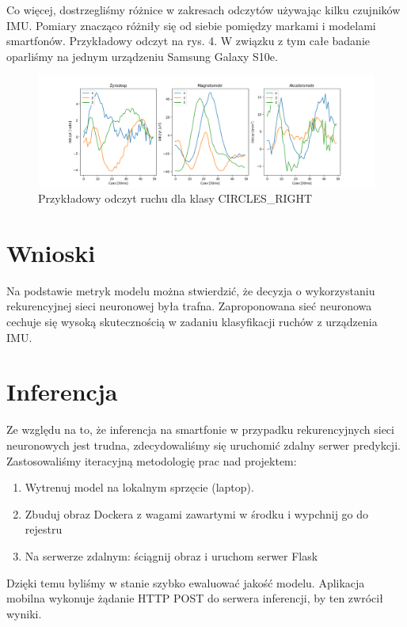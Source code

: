 \documentclass[10pt]{article}
\begin{document}
Co więcej, dostrzegliśmy różnice w zakresach odczytów używając kilku czujników IMU. Pomiary znacząco różniły się od siebie pomiędzy markami i modelami smartfonów. Przykładowy odczyt na rys. 4. W związku z tym całe badanie oparliśmy na jednym urządzeniu Samsung Galaxy S10e.


\begin{figure}[H]
  \includegraphics[width=16cm]{sample.png}
  \centering
  \caption{Przykładowy odczyt ruchu dla klasy CIRCLES\_RIGHT}
\end{figure}

\section{Wnioski}

Na podstawie metryk modelu można stwierdzić, że decyzja o wykorzystaniu rekurencyjnej sieci neuronowej była trafna. Zaproponowana sieć neuronowa cechuje się wysoką skutecznością w zadaniu klasyfikacji ruchów z urządzenia IMU.

\section{Inferencja}

Ze względu na to, że inferencja na smartfonie w przypadku rekurencyjnych sieci neuronowych jest trudna, zdecydowaliśmy się uruchomić zdalny serwer predykcji. Zastosowaliśmy iteracyjną metodologię prac nad projektem: 

\begin{enumerate}
  \item Wytrenuj model na lokalnym sprzęcie (laptop).
  \item Zbuduj obraz Dockera z wagami zawartymi w środku i wypchnij go do rejestru
  \item Na serwerze zdalnym: ściągnij obraz i uruchom serwer Flask
\end{enumerate}

Dzięki temu byliśmy w stanie szybko ewaluować jakość modelu. Aplikacja mobilna wykonuje żądanie HTTP POST do serwera inferencji, by ten zwrócił wyniki.
\end{document}
